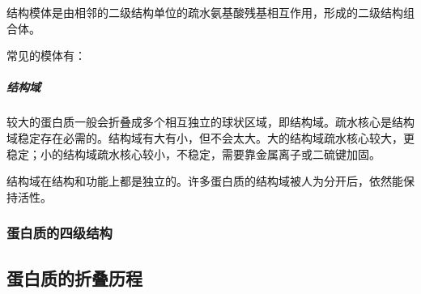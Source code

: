 结构模体是由相邻的二级结构单位的疏水氨基酸残基相互作用，形成的二级结构组合体。

常见的模体有：


\subparagraph{结构域}

较大的蛋白质一般会折叠成多个相互独立的球状区域，即结构域。疏水核心是结构域稳定存在必需的。结构域有大有小，但不会太大。大的结构域疏水核心较大，更稳定；小的结构域疏水核心较小，不稳定，需要靠金属离子或二硫键加固。

结构域在结构和功能上都是独立的。许多蛋白质的结构域被人为分开后，依然能保持活性。

\subsubsection{蛋白质的四级结构}


\subsection{蛋白质的折叠历程}

